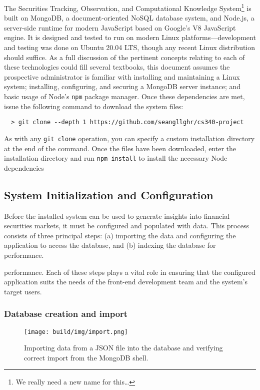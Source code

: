 \documentclass[
11pt,
titlepage,
]{article}
\begin{document}
The Securities Tracking, Observation, and Computational Knowledge
System\footnote{We really need a new name for this\ldots{}} is built on MongoDB,
a document-oriented NoSQL database system, and Node.js, a server-side runtime
for modern JavaScript based on Google's V8 JavaScript engine. It is designed and
tested to run on modern Linux platforms---development and testing was done on
Ubuntu 20.04 LTS, though any recent Linux distribution should suffice. As a full
discussion of the pertinent concepts relating to each of these technologies
could fill several textbooks, this document assumes the prospective
administrator is familiar with installing and maintaining a Linux system;
installing, configuring, and securing a MongoDB server instance; and basic usage
of Node's \texttt{npm} package manager. Once these dependencies are met, issue
the following command to download the system files:

\begin{lstlisting}
  > git clone --depth 1 https://github.com/seangllghr/cs340-project
\end{lstlisting}

\noindent As with any \texttt{git\ clone} operation, you can specify a custom
installation directory at the end of the command. Once the files have been
downloaded, enter the installation directory and run \texttt{npm\ install} to
install the necessary Node dependencies

\subsection{System Initialization and Configuration}

Before the installed system can be used to generate insights into financial
securities markets, it must be configured and populated with data. This process
consists of three principal steps: (a) importing the data and configuring the
application to access the database, and (b) indexing the database for
performance.

performance. Each of these steps plays a vital role in ensuring that the
configured application suits the needs of the front-end development team and the
system's target users.

\subsubsection{Database creation and import}

\begin{figure}[htbp]
  \texttt{[image: build/img/import.png]}
  \caption{Importing data from a JSON file into the database and verifying
    correct import from the MongoDB shell.}
  \label{fig:import}
\end{figure}
\end{document}

